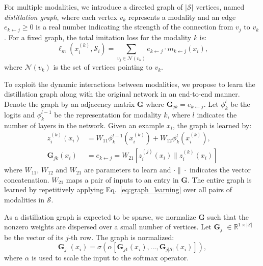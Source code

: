 For multiple modalities, we introduce a directed graph of $|\mathcal{S}|$ vertices, named \emph{distillation graph}, where each vertex $v_k$ represents a modality and an edge $e_{k \leftarrow j} \ge 0$ is a real number indicating the strength of the connection from $v_j$ to $v_k$. For a fixed graph, the total imitation loss for the modality $k$ is:
{\small
\begin{equation}
\ell_m(x_i^{(k)}, \mathcal{S}_i) = \sum_{v_j \in \mathcal{N}(v_k)} e_{k \leftarrow j} \cdot m_{k \leftarrow j}(x_i),
\end{equation}}where $\mathcal{N}(v_k)$ is the set of vertices pointing to $v_k$. 

To exploit the dynamic interactions between modalities, we propose to learn the distillation graph along with the original network in an end-to-end manner. Denote the graph by an adjacency matrix $\mathbf{G}$ where $\mathbf{G}_{jk} = e_{k \leftarrow j}$. Let $\phi_k^l$ be the logits and $\phi_k^{l-1}$ be the representation for modality $k$, where $l$ indicates the number of layers in the network. Given an example $x_i$, the graph is learned by:
{\small
\begin{align}
z_i^{(k)}(x_i) &= W_{11} \phi_k^{l-1}(x_i^{(k)}) + W_{12} \phi_k^{l}(x_i^{(k)}), \\
\mathbf{G}_{jk}(x_i) &= e_{k \leftarrow j} = W_{21} [z_i^{(j)}(x_i) \|  z_i^{(k)}(x_i)]
\label{eq:graph_learning}
\end{align}}where $W_{11}$,  $W_{12}$ and $W_{21}$ are parameters to learn and $\cdot \| \cdot$ indicates the vector concatenation. $W_{21}$ maps a pair of inputs to an entry in $\mathbf{G}$. The entire graph is learned by repetitively applying Eq.~\eqref{eq:graph_learning} over all pairs of modalities in $\mathcal{S}$.

As a distillation graph is expected to be sparse, we normalize $\mathbf{G}$ such that the nonzero weights are dispersed over a small number of vertices. Let $\mathbf{G}_{j:} \in \mathbb{R}^{1 \times |\mathcal{S}|}$ be the vector of its $j$-th row. The graph is normalized:
{\small
\begin{equation}
\label{eq:graph_learning_softmax}
\mathbf{G}_{j:}(x_i) = \sigma(\alpha [\mathbf{G}_{j1}(x_i), ..., \mathbf{G}_{j|\mathcal{S}|}(x_i)]),
\end{equation}}where $\alpha$ is used to scale the input to the softmax operator. 

